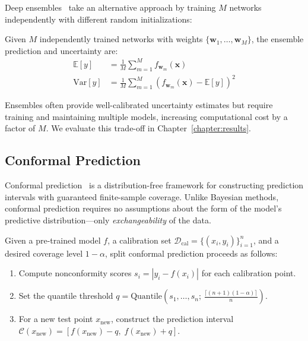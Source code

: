 Deep ensembles~\cite{lakshminarayanan2017simple} take an alternative approach by training $M$ networks independently with different random initializations:

\begin{definition}
Given $M$ independently trained networks with weights $\{\mathbf{w}_1, \ldots, \mathbf{w}_M\}$, the ensemble prediction and uncertainty are:
\begin{align}
    \mathbb{E}[y] &= \frac{1}{M}\sum_{m=1}^{M}f_{\mathbf{w}_m}(\mathbf{x}) \\
    \text{Var}[y] &= \frac{1}{M}\sum_{m=1}^{M}\left(f_{\mathbf{w}_m}(\mathbf{x}) - \mathbb{E}[y]\right)^2
\end{align}
\end{definition}

Ensembles often provide well-calibrated uncertainty estimates but require training and maintaining multiple models, increasing computational cost by a factor of $M$. We evaluate this trade-off in Chapter~\ref{chapter:results}.

\subsection{Conformal Prediction}

Conformal prediction~\cite{angelopoulos2023conformal, vovk2005algorithmic} is a distribution-free framework for constructing prediction intervals with guaranteed finite-sample coverage. Unlike Bayesian methods, conformal prediction requires no assumptions about the form of the model's predictive distribution---only \emph{exchangeability} of the data.

\begin{definition}
Given a pre-trained model $f$, a calibration set $\mathcal{D}_\text{cal} = \{(x_i, y_i)\}_{i=1}^n$, and a desired coverage level $1 - \alpha$, split conformal prediction proceeds as follows:
\begin{enumerate}
    \item Compute nonconformity scores $s_i = |y_i - f(x_i)|$ for each calibration point.
    \item Set the quantile threshold $q = \text{Quantile}\!\left(s_1, \ldots, s_n;\, \frac{\lceil (n+1)(1-\alpha) \rceil}{n}\right)$.
    \item For a new test point $x_\text{new}$, construct the prediction interval $\mathcal{C}(x_\text{new}) = [f(x_\text{new}) - q,\; f(x_\text{new}) + q]$.
\end{enumerate}
\end{definition}

